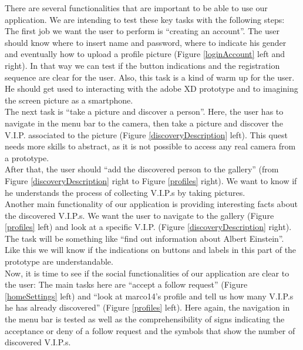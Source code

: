 \documentclass[12pt]{scrartcl}
\begin{document}
		
		There are several functionalities that are important to be able to use our application. We are intending to test these key tasks with the following steps:\\

		The first job we want the user to perform is “creating an account”. The user should know where to insert name and password, where to indicate his 	gender and eventually how to upload a profile picture (Figure \ref{loginAccount} left and right). In that way we can test if the button indications and the registration sequence are clear for the user. Also, this task is a kind of warm up for the user. He should get used to interacting with the adobe XD prototype and to imagining the screen picture as a smartphone.\\

		The next task is “take a picture and discover a person”. Here, the user has to navigate in the menu bar to the camera, then take a picture and discover the V.I.P. associated to the picture (Figure \ref{discoveryDescription} left). This quest needs more skills to abstract, as it is not possible to access any real camera from a prototype.\\

		After that, the user should “add the discovered person to the gallery” (from Figure \ref{discoveryDescription} right to Figure \ref{profiles} right). We want to know if he understands the process of collecting V.I.P.s by taking pictures.\\

 		Another main functionality of our application is providing interesting facts about the discovered V.I.P.s. We want the user to navigate to the gallery (Figure \ref{profiles} left) and look at a specific V.I.P. (Figure \ref{discoveryDescription} right). The task will be something like “find out information about Albert Einstein”. Like this we will know if the indications on buttons and labels in this part of the prototype are understandable.\\

		Now, it is time to see if the social functionalities of our application are clear to the user: The main tasks here are “accept a follow request” (Figure \ref{homeSettings} left) and “look at marco14’s profile and tell us how many V.I.P.s he has already discovered” (Figure \ref{profiles} left). Here again, the navigation in the menu bar is tested as well as the comprehensibility of signs indicating the acceptance or deny of a follow request and the symbols that show the number of discovered V.I.P.s.\\
\end{document}
